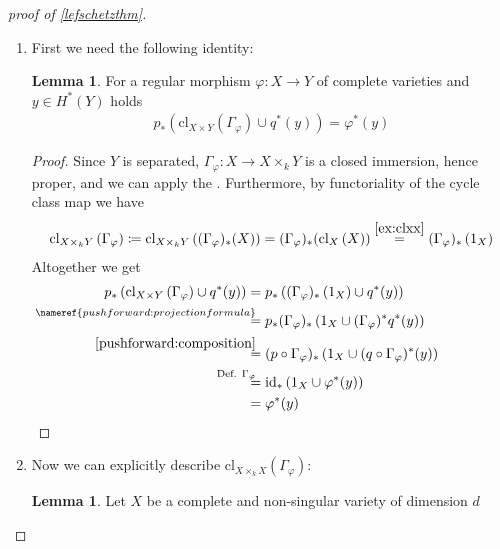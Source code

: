\documentclass[english]{scrartcl}
\theoremstyle{definition}
\newtheorem{Lem}[Def]{Lemma}
\theoremstyle{remark}
\newcommand*{\id}{\text{id}} %
\newcommand*{\Graph}[1]{{\Gamma_{#1}}} %
\newcommand*{\cl}[2]{{\text{cl}_{#1}\left(#2\right)}} %
\newcommand*{\one}[1]{{1_{#1}}}%
\renewcommand*{\phi}{\varphi}
\begin{document}
\begin{proof}[proof of \autoref{lefschetzthm}]~
  \begin{enumerate}[label={Step \arabic*.}]
  \item %
    First we need the following identity:
    \begin{Lem}\label{step1}
      For a regular morphism $\phi\colon X\to Y$ of complete varieties
      and $y\in H^*(Y)$ holds
      \begin{gather*}
        p_*\left(\cl{X\times Y}{\Graph{\phi}} \cup q^*(y)\right)
        = \phi^*(y)           
      \end{gather*}
      \begin{proof}
        Since $Y$ is separated, $\Graph{\phi}\colon X\to X\times_k Y$
        is a closed immersion, hence proper, and we can apply the 
        . %
        Furthermore, by functoriality of the cycle class map we have
        \begin{gather}
          \cl{X\times_k Y}{\Graph{\phi}} \coloneqq
          \cl{X\times_k Y}{(\Graph{\phi})_*(X)} =
          (\Graph{\phi})_*(\cl{X}{X}) \overset{\ref{ex:clxx}}{=} %
          (\Graph{\phi})_*\left(\one{X}\right)
        \end{gather}
        Altogether we get
        \begin{align*}
          p_*\left(\cl{X\times Y}{\Graph{\phi}} \cup q^*(y)\right)
          &=  p_*\left(
            (\Graph{\phi})_*\left(\one{X}\right) \cup q^*(y)
            \right)\\
          &\overset{\mathllap{\nameref{pushforward:projectionformula}}}{=}
            p_*(\Graph{\phi})_*\left( \one{X} \cup (\Graph{\phi})^*q^*(y) \right)\\
          &\overset{\mathllap{\eqref{pushforward:composition}}}=
            (p\circ\Graph{\phi})_* \left(
            \one{X} \cup (q\circ\Graph{\phi})^*(y) \right)\\
          &\overset{\mathllap{\text{Def. $\Graph\phi$}}}=
            \id_* \left( \one{X} \cup \phi^*(y) \right)\\
          &= \phi^*(y)
        \end{align*}
      \end{proof}
    \end{Lem}
  \item Now we can explicitly describe
    $\cl{X\times_k X}{\Graph{\phi}}$:
    \begin{Lem}
      Let $X$ be a complete and non-singular variety of dimension $d$

\end{Lem}
\end{enumerate}
\end{proof}
\end{document}
